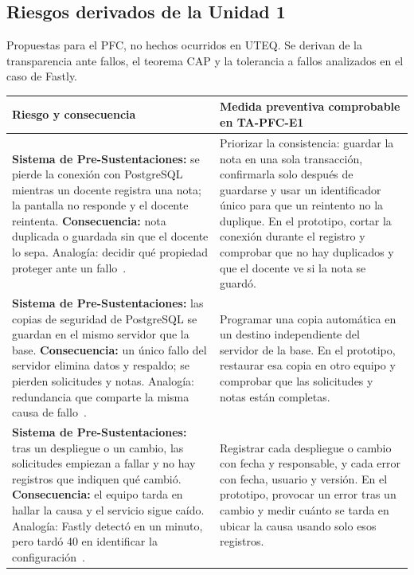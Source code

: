 \subsection*{Riesgos derivados de la Unidad 1}
Propuestas para el PFC, no hechos ocurridos en UTEQ. Se derivan de la transparencia ante fallos, el teorema CAP y la tolerancia a fallos analizados en el caso de Fastly.

\begingroup
\small
\renewcommand{\arraystretch}{1.15}
\begin{tabularx}{\linewidth}{@{}YY@{}}
\toprule
Riesgo y consecuencia & Medida preventiva comprobable en TA-PFC-E1 \\
\midrule
\textbf{Sistema de Pre-Sustentaciones:} se pierde la conexión con PostgreSQL mientras un docente registra una nota; la pantalla no responde y el docente reintenta. \textbf{Consecuencia:} nota duplicada o guardada sin que el docente lo sepa. Analogía: decidir qué propiedad proteger ante un fallo~\cite{brewer2012}.
& Priorizar la consistencia: guardar la nota en una sola transacción, confirmarla solo después de guardarse y usar un identificador único para que un reintento no la duplique. En el prototipo, cortar la conexión durante el registro y comprobar que no hay duplicados y que el docente ve si la nota se guardó. \\
\addlinespace
\textbf{Sistema de Pre-Sustentaciones:} las copias de seguridad de PostgreSQL se guardan en el mismo servidor que la base. \textbf{Consecuencia:} un único fallo del servidor elimina datos y respaldo; se pierden solicitudes y notas. Analogía: redundancia que comparte la misma causa de fallo~\cite{avizienis2004}.
& Programar una copia automática en un destino independiente del servidor de la base. En el prototipo, restaurar esa copia en otro equipo y comprobar que las solicitudes y notas están completas. \\
\addlinespace
\textbf{Sistema de Pre-Sustentaciones:} tras un despliegue o un cambio, las solicitudes empiezan a fallar y no hay registros que indiquen qué cambió. \textbf{Consecuencia:} el equipo tarda en hallar la causa y el servicio sigue caído. Analogía: Fastly detectó en un minuto, pero tardó 40 en identificar la configuración~\cite{fastly2021}.
& Registrar cada despliegue o cambio con fecha y responsable, y cada error con fecha, usuario y versión. En el prototipo, provocar un error tras un cambio y medir cuánto se tarda en ubicar la causa usando solo esos registros. \\
\bottomrule
\end{tabularx}
\endgroup
